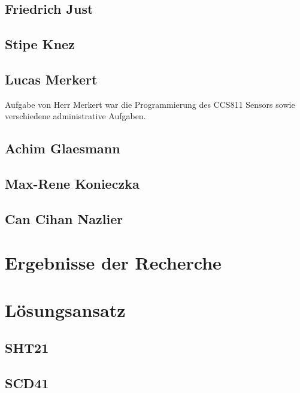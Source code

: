 \documentclass[]{article}
\begin{document}
		\subsection{Friedrich Just}
		\subsection{Stipe Knez}
		\subsection{Lucas Merkert}
			Aufgabe von Herr Merkert war die Programmierung des CCS811 Sensors sowie verschiedene administrative Aufgaben.
		\subsection{Achim Glaesmann}
		\subsection{Max-Rene Konieczka}
		\subsection{Can Cihan Nazlier}
		
	\section{Ergebnisse der Recherche}%
	\section{Lösungsansatz} %
		\subsection{SHT21}
		\subsection{SCD41}
\end{document}
